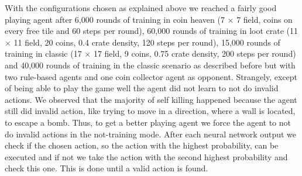 With the configurations chosen as explained above we reached a fairly good playing agent after 6,000 rounds of training in coin heaven (7 $\times$ 7 field, coins on every free tile and 60 steps per round), 60,000 rounds of training in loot crate (11 $\times$ 11 field, 20 coins, 0.4 crate density, 120 steps per round), 15,000 rounds of training in classic (17 $\times$ 17 field, 9 coins, 0.75 crate density, 200 steps per round) and 40,000 rounds of training in the classic scenario as described before but with two rule-based agents and one coin collector agent as opponent. Strangely, except of being able to play the game well the agent did not learn to not do invalid actions. We observed that the majority of self killing happened because the agent still did invalid action, like trying to move in a direction, where a wall is located, to escape a bomb. Thus, to get a better playing agent we force the agent to not do invalid actions in the not-training mode. After each neural network output we check if the chosen action, so the action with the highest probability, can be executed and if not we take the action with the second highest probability and check this one. This is done until a valid action is found. \\

